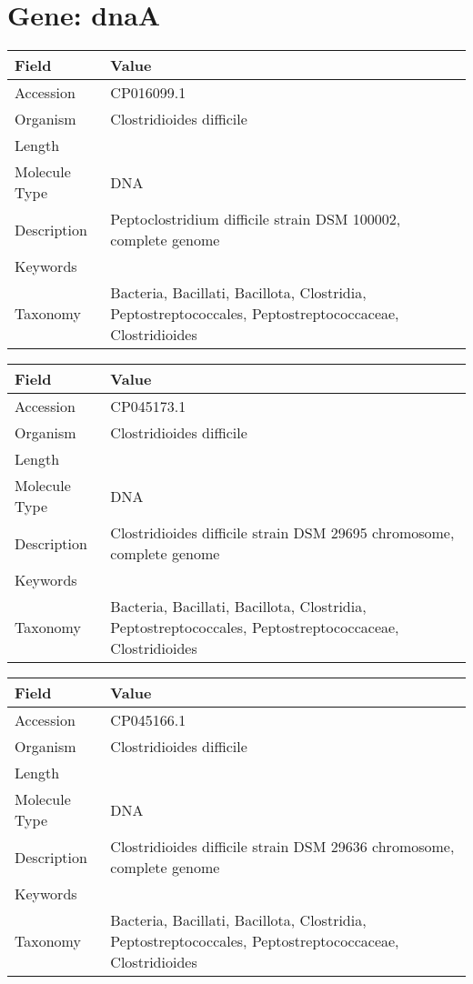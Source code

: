 \documentclass[10pt]{article}
\begin{document}
\section{Gene: dnaA}
{\footnotesize
\begin{longtable}{>{\raggedright\arraybackslash}p{4.5cm} >{\raggedright\arraybackslash}p{11.5cm}}
\textbf{Field} & \textbf{Value} \\
\hline
Accession & CP016099.1 \\
Organism & Clostridioides difficile \\
Length & 4208574 \\
Molecule Type & DNA \\
Description & Peptoclostridium difficile strain DSM 100002, complete genome \\
Keywords &  \\
Taxonomy & Bacteria, Bacillati, Bacillota, Clostridia, Peptostreptococcales, Peptostreptococcaceae, Clostridioides \\
\end{longtable}
}

\vspace{1em}
{\footnotesize
\begin{longtable}{>{\raggedright\arraybackslash}p{4.5cm} >{\raggedright\arraybackslash}p{11.5cm}}
\textbf{Field} & \textbf{Value} \\
\hline
Accession & CP045173.1 \\
Organism & Clostridioides difficile \\
Length & 4320488 \\
Molecule Type & DNA \\
Description & Clostridioides difficile strain DSM 29695 chromosome, complete genome \\
Keywords &  \\
Taxonomy & Bacteria, Bacillati, Bacillota, Clostridia, Peptostreptococcales, Peptostreptococcaceae, Clostridioides \\
\end{longtable}
}

\vspace{1em}
{\footnotesize
\begin{longtable}{>{\raggedright\arraybackslash}p{4.5cm} >{\raggedright\arraybackslash}p{11.5cm}}
\textbf{Field} & \textbf{Value} \\
\hline
Accession & CP045166.1 \\
Organism & Clostridioides difficile \\
Length & 4162984 \\
Molecule Type & DNA \\
Description & Clostridioides difficile strain DSM 29636 chromosome, complete genome \\
Keywords &  \\
Taxonomy & Bacteria, Bacillati, Bacillota, Clostridia, Peptostreptococcales, Peptostreptococcaceae, Clostridioides \\
\end{longtable}
}
\end{document}
